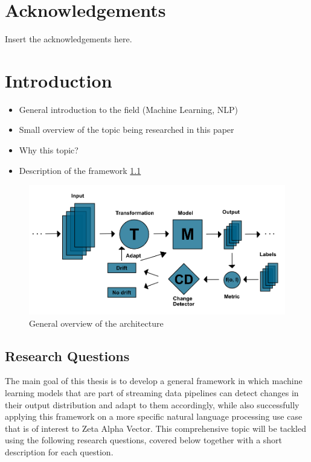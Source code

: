 \documentclass[12pt]{extreport}
\begin{document}
\chapter*{Acknowledgements}

Insert the acknowledgements here.

\tableofcontents

\listoffigures

\listoftables

\chapter{Introduction} \label{sec:intro}

\begin{itemize}
    \item General introduction to the field (Machine Learning, NLP)
    \item Small overview of the topic being researched in this paper
    \item Why this topic?
    \item Description of the framework \ref{fig:framework}
\end{itemize}

\begin{figure}[h!]
\centering
\includegraphics[width=\linewidth]{assets/introduction/framework.png}
\caption{General overview of the architecture}
\label{fig:framework}
\end{figure}

\section{Research Questions}

The main goal of this thesis is to develop a general framework in which machine learning models that are part of streaming data pipelines can detect changes in their output distribution and adapt to them accordingly, while also successfully applying this framework on a more specific natural language processing use case that is of interest to Zeta Alpha Vector. This comprehensive topic will be tackled using the following research questions, covered below together with a short description for each question.
\end{document}
